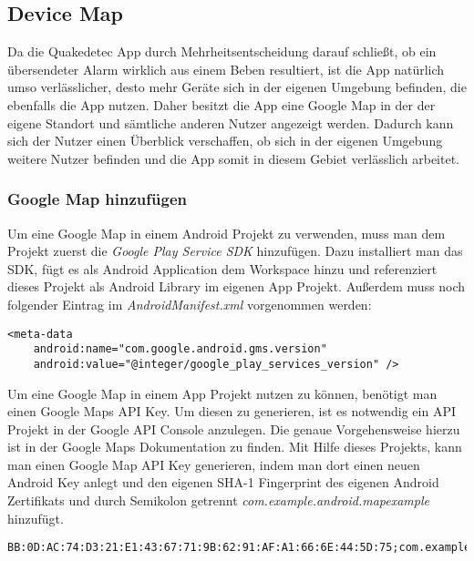 \newpage
\subsection{Device Map}
Da die Quakedetec App durch Mehrheitsentscheidung darauf schließt, ob ein übersendeter Alarm wirklich aus einem Beben resultiert, ist die App natürlich umso verlässlicher, desto mehr Geräte sich in der eigenen Umgebung befinden, die ebenfalls die App nutzen. Daher besitzt die App eine Google Map in der der eigene Standort und sämtliche anderen Nutzer angezeigt werden. Dadurch kann sich der Nutzer einen Überblick verschaffen, ob sich in der eigenen Umgebung weitere Nutzer befinden und die App somit in diesem Gebiet verlässlich arbeitet.

\subsubsection{Google Map hinzufügen}
Um eine Google Map in einem Android Projekt zu verwenden, muss man dem Projekt zuerst die \textit{Google Play Service SDK} hinzufügen. Dazu installiert man das SDK, fügt es als Android Application dem Workspace hinzu und referenziert dieses Projekt als Android Library im eigenen App Projekt. Außerdem muss noch folgender Eintrag im \textit{AndroidManifest.xml} vorgenommen werden:

\begin{lstlisting}[caption={Google Map AndroidManifest.xml Eintrag},label=lst:MapInsertManifest]
<meta-data
    android:name="com.google.android.gms.version"
    android:value="@integer/google_play_services_version" />
\end{lstlisting}

Um eine Google Map in einem App Projekt nutzen zu können, benötigt man einen Google Maps API Key. Um diesen zu generieren, ist es notwendig ein API Projekt in der Google API Console anzulegen. Die genaue Vorgehensweise hierzu ist in der Google Maps Dokumentation zu finden. Mit Hilfe dieses Projekts, kann man einen Google Map API Key generieren, indem man dort einen neuen Android Key anlegt und den eigenen SHA-1 Fingerprint des eigenen Android Zertifikats und durch Semikolon getrennt \textit{com.example.android.mapexample} hinzufügt.

\begin{lstlisting}[caption={Android API Key},label=lst:AndroidApiKey, basicstyle=\small]
BB:0D:AC:74:D3:21:E1:43:67:71:9B:62:91:AF:A1:66:6E:44:5D:75;com.example.android.mapexample
\end{lstlisting}

